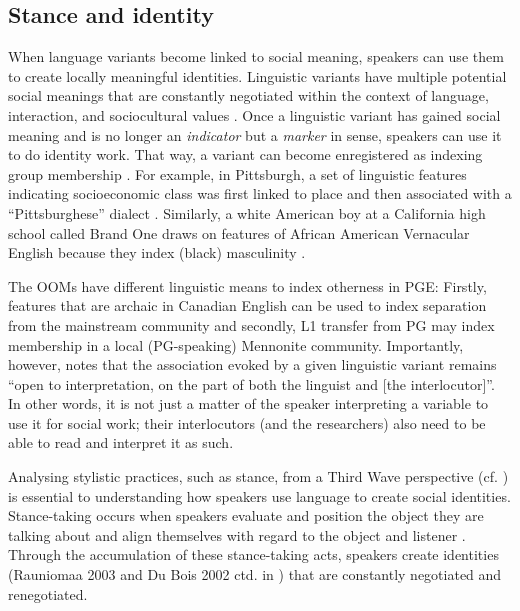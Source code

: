 \documentclass[output=paper]{langscibook}
\begin{document}
\subsection{Stance and identity}\label{neuhausen:sec:3.2}
When language variants become linked to social meaning, speakers can use them to create locally meaningful identities. Linguistic variants have multiple potential social meanings that are constantly negotiated within the context of language, interaction, and sociocultural values \citep[139]{du_bois_stance_2007}. Once a linguistic variant has gained social meaning and is no longer an \textit{indicator} but a \textit{marker} in  sense, speakers can use it to do identity work. That way, a variant can become enregistered as indexing group membership \citep[94]{eckert_three_2012}. For example, in Pittsburgh, a set of linguistic features indicating socioeconomic class was first linked to place and then associated with a “Pittsburghese” dialect \citep{johnstone_mobility_2006}. Similarly, a white American boy at a California high school called Brand One draws on features of African American Vernacular English because they index (black) masculinity \citep{buchholtz_you_1999}. 

The \glspl*{OOM} have different linguistic means to index otherness in \gls*{PGE}: Firstly, features that are archaic in Canadian English can be used to index separation from the mainstream community and secondly, L1 transfer from \gls*{PG} may index membership in a local (\gls*{PG}-speaking) Mennonite community. Importantly, however, \citet[496]{podesva_phonation_2007} notes that the association evoked by a given linguistic variant remains “open to interpretation, on the part of both the linguist and [the interlocutor]”. In other words, it is not just a matter of the speaker interpreting a variable to use it for social work; their interlocutors (and the researchers) also need to be able to read and interpret it as such. 

Analysing stylistic practices, such as stance, from a Third Wave perspective (cf. \citealt{eckert_three_2012}) is essential to understanding how speakers use language to create social identities. Stance-taking occurs when speakers evaluate and position the object they are talking about and align themselves with regard to the object and listener \citep{du_bois_stance_2007}. Through the accumulation of these stance-taking acts, speakers create identities (Rauniomaa 2003 and Du Bois 2002 ctd. in \citealt[596]{buchholtz_identity_2005}) that are constantly negotiated and renegotiated. 
\end{document}
